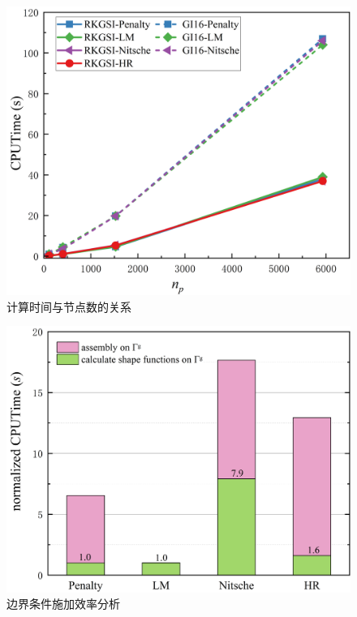 \begin{figure}[H]
    \centering
    \includegraphics[scale=0.5]{figure/EHR/hole/cputime.png}
    \caption{计算时间与节点数的关系}\label{Hcputime}
\end{figure}
\begin{figure}[H]
    \centering
    \includegraphics[scale=0.5]{figure/EHR/hole/efficiency.png}
    \caption{边界条件施加效率分析}\label{Hefficiency}
\end{figure}
\newpage
